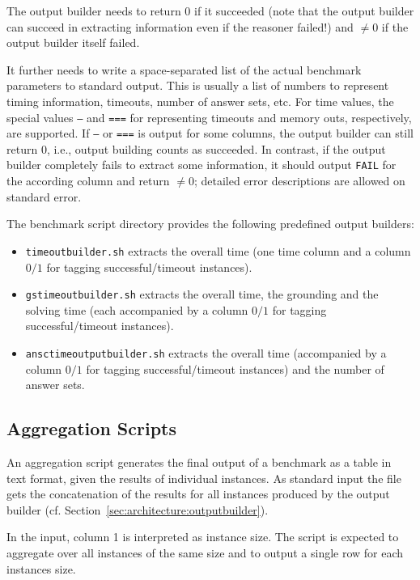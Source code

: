 \documentclass[a4paper]{article}
\begin{document}
			The output builder needs to return $0$ if it succeeded (note that the output builder can succeed in extracting information even if the reasoner failed!)
			and $\not=0$ if the output builder itself failed.
			
			It further needs to write a space-separated list of the actual benchmark parameters to standard output.
			This is usually a list of numbers to represent timing information, timeouts, number of answer sets, etc. For time values,
			the special values {\tt ---} and {\tt ===} for representing timeouts and memory outs, respectively, are supported.
			If {\tt ---} or {\tt ===} is output for some columns, the output builder can still return $0$, i.e.,
			output building counts as succeeded.
			In contrast, if the output builder completely fails to extract some information, it should output {\tt FAIL} for the according column
			and return $\not=0$; detailed error descriptions are allowed on standard error.
			
			The benchmark script directory provides the following predefined output builders:
					
			\begin{itemize}
			    \item {\tt timeoutbuilder.sh} extracts the overall time (one time column and a column $0/1$ for tagging successful/timeout instances).
			    \item {\tt gstimeoutbuilder.sh} extracts the overall time, the grounding and the solving time (each accompanied by a column $0/1$ for tagging successful/timeout instances).
			    \item {\tt ansctimeoutputbuilder.sh} extracts the overall time (accompanied by a column $0/1$ for tagging successful/timeout instances) and the number of answer sets.
			\end{itemize}
	
		\subsection{Aggregation Scripts}
		\label{sec:architecture:aggregate}
	
			An aggregation script
		    generates the final output of a benchmark as a table in text format,
		    given the results of individual instances.
		    As standard input the file gets the concatenation of the results for all instances produced by the output builder (cf. Section~\ref{sec:architecture:outputbuilder}).
	
			In the input, column 1 is interpreted as instance size. The script is expected to aggregate
			over all instances of the same size and to output a single row for each instances size.
	
\end{document}
